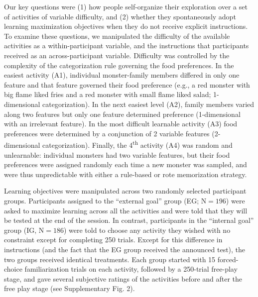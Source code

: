     Our key questions were (1) how people self-organize their exploration over a set of activities of variable difficulty, and (2) whether they spontaneously adopt learning maximization objectives when they do not receive explicit instructions. To examine these questions, we manipulated the difficulty of the available activities as a within-participant variable, and the instructions that participants received as an across-participant variable. Difficulty was controlled by the complexity of the categorization rule governing the food preferences.  In the easiest activity (A1), individual monster-family members differed in only one feature and that feature governed their food preference (e.g., a red monster with big flame liked fries and a red monster with small flame liked salad; 1-dimensional categorization). In the next easiest level (A2), family members varied along two features but only one feature determined preference (1-dimensional with an irrelevant feature). In the most difficult learnable activity (A3)  food preferences were determined by a conjunction of 2 variable features (2-dimensional categorization). Finally, the 4\textsuperscript{th} activity (A4) was random and unlearnable: individual monsters had two variable features, but their food preferences were assigned randomly each time a new monster was sampled, and were thus unpredictable with either a rule-based or rote memorization strategy.
    
    Learning objectives were manipulated across two randomly selected  participant groups. Participants assigned to the “external goal” group (EG; $\text{N} = 196$) were asked to maximize learning across all the activities and were told that they will be tested at the end of the session. In contrast, participants in the “internal goal” group (IG, $\text{N} = 186$) were told to choose any activity they wished with no constraint except for completing 250 trials. Except for this difference in instructions (and the fact that the EG group received the announced test), the two groups received identical treatments. Each group started with 15 forced-choice familiarization trials on each activity, followed by a 250-trial free-play stage, and gave several subjective ratings of the activities before and after the free play stage (see Supplementary Fig. 2).
    
